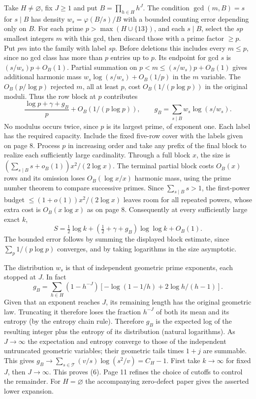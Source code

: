 \newpage
{}
Take $H\ne\varnothing$, fix $J\ge1$ and put $B=\prod_{h\in H}h^J$. The condition $\gcd(m,B)=s$ for $s\mid B$ has density $w_s=\varphi(B/s)/B$ with a bounded counting error depending only on $B$. For each prime $p>\max(H\cup\{13\})$, and each $s\mid B$, select the $sp$ smallest integers $m$ with this gcd, then discard those with a prime factor $\ge p$. Put $pm$ into the family with label $sp$. Before deletions this includes every $m\le p$, since no gcd class has more than $p$ entries up to $p$. Its endpoint for gcd $s$ is $(s/w_s)p+O_B(1)$. Partial summation on $p<m\le(s/w_s)p+O_B(1)$ gives additional harmonic mass $w_s\log(s/w_s)+O_B(1/p)$ in the $m$ variable. The $O_B(p/\log p)$ rejected $m$, all at least $p$, cost $O_B(1/(p\log p))$ in the original moduli. Thus the row block at $p$ contributes
\[
 \frac{\log p+\gamma+g_B}{p}+O_B(1/(p\log p)),\qquad
 g_B=\sum_{s\mid B}w_s\log(s/w_s).
\]
No modulus occurs twice, since $p$ is its largest prime, of exponent one. Each label has the required capacity. Include the fixed five-row cover with the labels given on page 8. Process $p$ in increasing order and take any prefix of the final block to realize each sufficiently large cardinality. Through a full block $x$, the size is $(\sum_{s\mid B}s+o_B(1))x^2/(2\log x)$. The terminal partial block costs $O_B(x)$ rows and its omission loses $O_B(\log x/x)$ harmonic mass, using the prime number theorem to compare successive primes. Since $\sum_{s\mid B}s>1$, the first-power budget $\le(1+o(1))x^2/(2\log x)$ leaves room for all repeated powers, whose extra cost is $O_B(x\log x)$ as on page 8. Consequently at every sufficiently large exact $k$,
\[
 S=\tfrac12\log k+(\tfrac12+\gamma+g_B)\log\log k+O_B(1).
\]
The bounded error follows by summing the displayed block estimate, since $\sum_p1/(p\log p)$ converges, and by taking logarithms in the size asymptotic.

The distribution $w_s$ is that of independent geometric prime exponents, each stopped at $J$. In fact
\[
 g_B=\sum_{h\in H}(1-h^{-J})\left[-\log(1-1/h)+2\log h/(h-1)\right].
\]
Given that an exponent reaches $J$, its remaining length has the original geometric law. Truncating it therefore loses the fraction $h^{-J}$ of both its mean and its entropy (by the entropy chain rule). Therefore $g_B$ is the expected log of the resulting integer plus the entropy of its distribution (natural logarithms). As $J\to\infty$ the expectation and entropy converge to those of the independent untruncated geometric variables; their geometric tails times $1+j$ are summable. This gives $g_B\to \sum_{s\in\mathcal T}(v/s)\log(s^2/v)=C_H-1$. First take $k\to\infty$ for fixed $J$, then $J\to\infty$. This proves (6). Page 11 refines the choice of cutoffs to control the remainder. For $H=\varnothing$ the accompanying zero-defect paper gives the asserted lower expansion.

